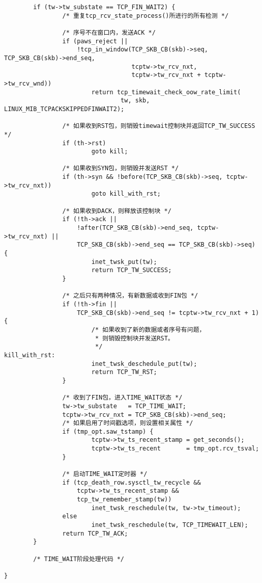 \begin{verbatim}
        if (tw->tw_substate == TCP_FIN_WAIT2) {
                /* 重复tcp_rcv_state_process()所进行的所有检测 */

                /* 序号不在窗口内，发送ACK */
                if (paws_reject ||
                    !tcp_in_window(TCP_SKB_CB(skb)->seq, TCP_SKB_CB(skb)->end_seq,
                                   tcptw->tw_rcv_nxt,
                                   tcptw->tw_rcv_nxt + tcptw->tw_rcv_wnd))
                        return tcp_timewait_check_oow_rate_limit(
                                tw, skb, LINUX_MIB_TCPACKSKIPPEDFINWAIT2);

                /* 如果收到RST包，则销毁timewait控制块并返回TCP_TW_SUCCESS */
                if (th->rst)
                        goto kill;

                /* 如果收到SYN包，则销毁并发送RST */
                if (th->syn && !before(TCP_SKB_CB(skb)->seq, tcptw->tw_rcv_nxt))
                        goto kill_with_rst;

                /* 如果收到DACK，则释放该控制块 */
                if (!th->ack ||
                    !after(TCP_SKB_CB(skb)->end_seq, tcptw->tw_rcv_nxt) ||
                    TCP_SKB_CB(skb)->end_seq == TCP_SKB_CB(skb)->seq) {
                        inet_twsk_put(tw);
                        return TCP_TW_SUCCESS;
                }

                /* 之后只有两种情况，有新数据或收到FIN包 */
                if (!th->fin ||
                    TCP_SKB_CB(skb)->end_seq != tcptw->tw_rcv_nxt + 1) {
                        /* 如果收到了新的数据或者序号有问题，
                         * 则销毁控制块并发送RST。 
                         */
kill_with_rst:
                        inet_twsk_deschedule_put(tw);
                        return TCP_TW_RST;
                }

                /* 收到了FIN包，进入TIME_WAIT状态 */
                tw->tw_substate   = TCP_TIME_WAIT;
                tcptw->tw_rcv_nxt = TCP_SKB_CB(skb)->end_seq;
                /* 如果启用了时间戳选项，则设置相关属性 */
                if (tmp_opt.saw_tstamp) {
                        tcptw->tw_ts_recent_stamp = get_seconds();
                        tcptw->tw_ts_recent       = tmp_opt.rcv_tsval;
                }

                /* 启动TIME_WAIT定时器 */
                if (tcp_death_row.sysctl_tw_recycle &&
                    tcptw->tw_ts_recent_stamp &&
                    tcp_tw_remember_stamp(tw))
                        inet_twsk_reschedule(tw, tw->tw_timeout);
                else
                        inet_twsk_reschedule(tw, TCP_TIMEWAIT_LEN);
                return TCP_TW_ACK;
        }

        /* TIME_WAIT阶段处理代码 */

}
\end{verbatim}

